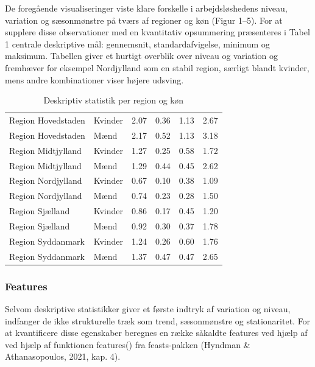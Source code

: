 \documentclass[
]{article}
\begin{document}
De foregående visualiseringer viste klare forskelle i arbejdsløshedens
niveau, variation og sæsonmønstre på tværs af regioner og køn (Figur
1--5). For at supplere disse observationer med en kvantitativ
opsummering præsenteres i Tabel 1 centrale deskriptive mål: gennemsnit,
standardafvigelse, minimum og maksimum. Tabellen giver et hurtigt
overblik over niveau og variation og fremhæver for eksempel Nordjylland
som en stabil region, særligt blandt kvinder, mens andre kombinationer
viser højere udsving.

\begin{longtable}[t]{llrrrr}
\caption{Deskriptiv statistik per region og køn}\\
\toprule
\cellcolor[HTML]{f0f0f0}{\textbf{region}} & \cellcolor[HTML]{f0f0f0}{\textbf{kon}} & \cellcolor[HTML]{f0f0f0}{\textbf{Gennemsnit}} & \cellcolor[HTML]{f0f0f0}{\textbf{Standardafvigelse}} & \cellcolor[HTML]{f0f0f0}{\textbf{Minimum}} & \cellcolor[HTML]{f0f0f0}{\textbf{Maksimum}}\\
\midrule
Region Hovedstaden & Kvinder & 2.07 & 0.36 & 1.13 & 2.67\\
Region Hovedstaden & Mænd & 2.17 & 0.52 & 1.13 & 3.18\\
Region Midtjylland & Kvinder & 1.27 & 0.25 & 0.58 & 1.72\\
Region Midtjylland & Mænd & 1.29 & 0.44 & 0.45 & 2.62\\
Region Nordjylland & Kvinder & 0.67 & 0.10 & 0.38 & 1.09\\
\addlinespace
Region Nordjylland & Mænd & 0.74 & 0.23 & 0.28 & 1.50\\
Region Sjælland & Kvinder & 0.86 & 0.17 & 0.45 & 1.20\\
Region Sjælland & Mænd & 0.92 & 0.30 & 0.37 & 1.78\\
Region Syddanmark & Kvinder & 1.24 & 0.26 & 0.60 & 1.76\\
Region Syddanmark & Mænd & 1.37 & 0.47 & 0.47 & 2.65\\
\bottomrule
\end{longtable}

\subsubsection{Features}\label{features}

Selvom deskriptive statistikker giver et første indtryk af variation og
niveau, indfanger de ikke strukturelle træk som trend, sæsonmønstre og
stationaritet. For at kvantificere disse egenskaber beregnes en række
såkaldte features ved hjælp af ved hjælp af funktionen features() fra
feasts-pakken (Hyndman \& Athanasopoulos, 2021, kap. 4).
\end{document}
